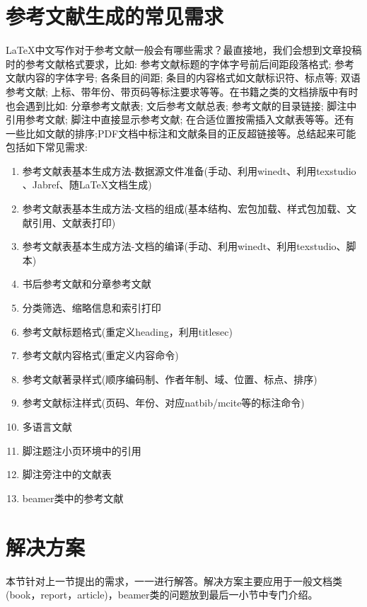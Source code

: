 \documentclass[twoside]{article} %
\begin{document}
\section{参考文献生成的常见需求}
\LaTeX 中文写作对于参考文献一般会有哪些需求？最直接地，我们会想到文章投稿时的参考文献格式要求，比如: 参考文献标题的字体字号前后间距段落格式; 参考文献内容的字体字号; 各条目的间距; 条目的内容格式如文献标识符、标点等; 双语参考文献; 上标、带年份、带页码等标注要求等等。在书籍之类的文档排版中有时也会遇到比如: 分章参考文献表; 文后参考文献总表; 参考文献的目录链接; 脚注中引用参考文献; 脚注中直接显示参考文献; 在合适位置按需插入文献表等等。还有一些比如文献的排序;PDF文档中标注和文献条目的正反超链接等。总结起来可能包括如下常见需求:
\begin{enumerate}
  \item 参考文献表基本生成方法-数据源文件准备(手动、利用winedt、利用texstudio 、Jabref、随\LaTeX 文档生成)
  \item 参考文献表基本生成方法-文档的组成(基本结构、宏包加载、样式包加载、文献引用、文献表打印)
  \item 参考文献表基本生成方法-文档的编译(手动、利用winedt、利用texstudio、脚本)
  \item 书后参考文献和分章参考文献
  \item 分类筛选、缩略信息和索引打印
  \item 参考文献标题格式(重定义heading，利用titlesec)
  \item 参考文献内容格式(重定义内容命令)
  \item 参考文献著录样式(顺序编码制、作者年制、域、位置、标点、排序)
  \item 参考文献标注样式(页码、年份、对应natbib/mcite等的标注命令)
  \item 多语言文献
  \item 脚注题注小页环境中的引用
  \item 脚注旁注中的文献表
  \item beamer类中的参考文献
\end{enumerate}

\section{解决方案}
本节针对上一节提出的需求，一一进行解答。解决方案主要应用于一般文档类(book，report，article)，beamer类的问题放到最后一小节中专门介绍。
\end{document}
